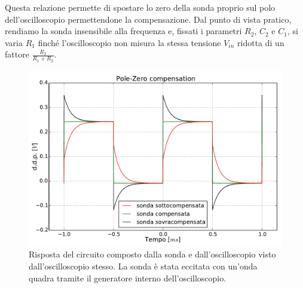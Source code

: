 Questa relazione permette di spostare lo zero della sonda proprio sul polo dell'oscilloscopio permettendone la compensazione.
Dal punto di vista pratico, rendiamo la sonda insensibile alla frequenza e, fissati i parametri $R_2$, $C_2$ e $C_1$, si varia $R_1$ finché l'oscilloscopio non misura la stessa tensione $V_{in}$ ridotta di un fattore $\frac{R_2}{R_1+R_2}$.

\begin{figure}[htpc]
\centering
\includegraphics[width=.65\textwidth]{../E08/latex/compensation.pdf}
\caption{Risposta del circuito composto dalla sonda e dall'oscilloscopio visto dall'oscilloscopio stesso. La sonda è stata eccitata con un'onda quadra tramite il generatore interno dell'oscilloscopio.}
\label{fig8:compensation}
\end{figure}